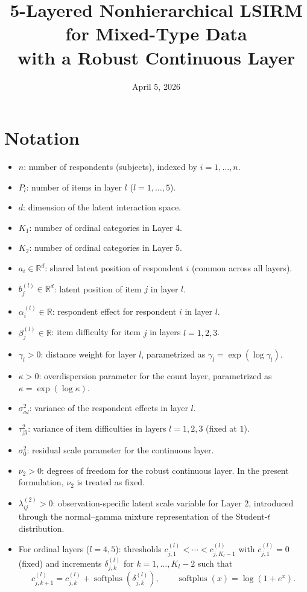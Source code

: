 \documentclass[11pt]{article}
\title{5-Layered Nonhierarchical LSIRM for Mixed-Type Data\\with a Robust Continuous Layer}
\date{April 5, 2026}
\begin{document}
\maketitle

\section{Notation}

\begin{itemize}[leftmargin=1.5em]
    \item $n$: number of respondents (subjects), indexed by $i=1,\dots,n$.
    \item $P_l$: number of items in layer $l$ ($l=1,\dots,5$).
    \item $d$: dimension of the latent interaction space.
    \item $K_1$: number of ordinal categories in Layer 4.
    \item $K_2$: number of ordinal categories in Layer 5.
    \item $a_i \in \mathbb{R}^d$: shared latent position of respondent $i$ (common across all layers).
    \item $b_j^{(l)} \in \mathbb{R}^d$: latent position of item $j$ in layer $l$.
    \item $\alpha_i^{(l)} \in \mathbb{R}$: respondent effect for respondent $i$ in layer $l$.
    \item $\beta_j^{(l)} \in \mathbb{R}$: item difficulty for item $j$ in layers $l=1,2,3$.
    \item $\gamma_l > 0$: distance weight for layer $l$, parametrized as $\gamma_l = \exp(\log \gamma_l)$.
    \item $\kappa > 0$: overdispersion parameter for the count layer, parametrized as $\kappa = \exp(\log \kappa)$.
    \item $\sigma_{\alpha l}^2$: variance of the respondent effects in layer $l$.
    \item $\tau_{\beta l}^2$: variance of item difficulties in layers $l=1,2,3$ (fixed at $1$).
    \item $\sigma_0^2$: residual scale parameter for the continuous layer.
    \item $\nu_2 > 0$: degrees of freedom for the robust continuous layer. In the present formulation, $\nu_2$ is treated as fixed.
    \item $\lambda_{ij}^{(2)} > 0$: observation-specific latent scale variable for Layer 2, introduced through the normal--gamma mixture representation of the Student-$t$ distribution.
    \item For ordinal layers ($l=4,5$): thresholds $c_{j,1}^{(l)} < \cdots < c_{j,K_l-1}^{(l)}$ with $c_{j,1}^{(l)} = 0$ (fixed) and increments $\delta_{j,k}^{(l)}$ for $k=1,\dots,K_l-2$ such that
    \[
    c_{j,k+1}^{(l)} = c_{j,k}^{(l)} + \operatorname{softplus}(\delta_{j,k}^{(l)}),
    \qquad
    \operatorname{softplus}(x)=\log(1+e^x).
    \]
\end{itemize}
\end{document}
